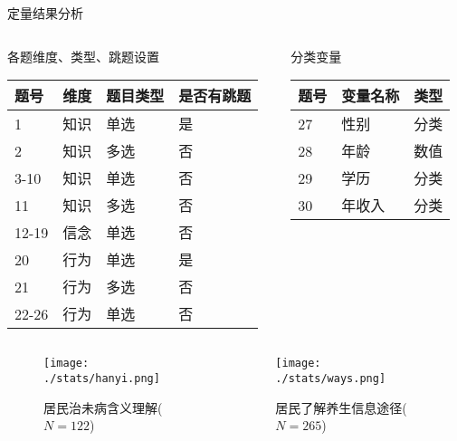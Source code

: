 \begin{frame}[allowframebreaks]{定量结果分析}
\begin{columns}
\begin{column}{0.7\textwidth}
    \begin{block}{各题维度、类型、跳题设置}
\begin{longtable}[]{@{}llll@{}}
    
    题号 & 维度 & 题目类型 & 是否有跳题\tabularnewline
    \hline
    \endhead
    1 & 知识 & 单选 & 是\tabularnewline
    2 & 知识 & 多选 & 否\tabularnewline
    3-10 & 知识 & 单选 & 否\tabularnewline
    11 & 知识 & 多选 & 否\tabularnewline
    12-19 & 信念 & 单选 & 否\tabularnewline
    20 & 行为 & 单选 & 是\tabularnewline
    21 & 行为 & 多选 & 否\tabularnewline
    22-26 & 行为 & 单选 & 否\tabularnewline
    \hline
\end{longtable}
\end{block}
\end{column}
\begin{column}{0.6\textwidth}
\begin{block}{分类变量}
\begin{longtable}[]{@{}lll@{}}
    
    题号 & 变量名称 & 类型\tabularnewline
    \hline
    \endhead
    27 & 性别 & 分类\tabularnewline
    28 & 年龄 & 数值\tabularnewline
    29 & 学历 & 分类\tabularnewline
    30 & 年收入 & 分类\tabularnewline
    \hline
\end{longtable}
\end{block}
\end{column}
\end{columns}
    \begin{columns}
    \begin{column}{0.6\textwidth}
\begin{figure}[h]\caption{居民治未病含义理解($N=122$)}
    \texttt{[image: ./stats/hanyi.png]}
    
\end{figure}
    \end{column}
    \begin{column}{0.6\textwidth}
        \begin{figure}[h] \caption{居民了解养生信息途径($N=265$)}
            \texttt{[image: ./stats/ways.png]}
           
        \end{figure} 
    \end{column}
\end{columns}


\end{frame}
